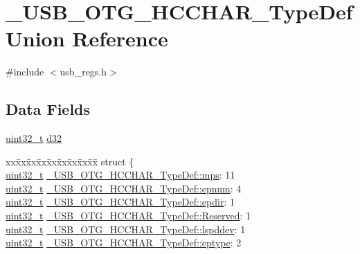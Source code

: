 \hypertarget{union___u_s_b___o_t_g___h_c_c_h_a_r___type_def}{\section{\-\_\-\-U\-S\-B\-\_\-\-O\-T\-G\-\_\-\-H\-C\-C\-H\-A\-R\-\_\-\-Type\-Def Union Reference}
\label{union___u_s_b___o_t_g___h_c_c_h_a_r___type_def}
}


{\ttfamily \#include $<$usb\-\_\-regs.\-h$>$}

\subsection*{Data Fields}
\begin{DoxyCompactItemize}
\item 
\hyperlink{stdint_8h_a435d1572bf3f880d55459d9805097f62}{uint32\-\_\-t} \hyperlink{group___u_s_b___o_t_g___d_r_i_v_e_r_ga0a0a2fc3e4194e8dd800311c652a6391}{d32}
\item 
\begin{tabbing}
xx\=xx\=xx\=xx\=xx\=xx\=xx\=xx\=xx\=\kill
struct \{\\
\>\hyperlink{stdint_8h_a435d1572bf3f880d55459d9805097f62}{uint32\_t} \hyperlink{group___u_s_b___o_t_g___d_r_i_v_e_r_ga5b4ec8eb01d4007623b8fc18806013d3}{\_USB\_OTG\_HCCHAR\_TypeDef::mps}: 11\\
\>\hyperlink{stdint_8h_a435d1572bf3f880d55459d9805097f62}{uint32\_t} \hyperlink{group___u_s_b___o_t_g___d_r_i_v_e_r_ga7e2db9d035440c79fe20394c7f2f6fb2}{\_USB\_OTG\_HCCHAR\_TypeDef::epnum}: 4\\
\>\hyperlink{stdint_8h_a435d1572bf3f880d55459d9805097f62}{uint32\_t} \hyperlink{group___u_s_b___o_t_g___d_r_i_v_e_r_ga69aafd73ac0b1c4a83b7991da998294a}{\_USB\_OTG\_HCCHAR\_TypeDef::epdir}: 1\\
\>\hyperlink{stdint_8h_a435d1572bf3f880d55459d9805097f62}{uint32\_t} \hyperlink{group___u_s_b___o_t_g___d_r_i_v_e_r_ga9195441c8e492c17349fe9493e41a76a}{\_USB\_OTG\_HCCHAR\_TypeDef::Reserved}: 1\\
\>\hyperlink{stdint_8h_a435d1572bf3f880d55459d9805097f62}{uint32\_t} \hyperlink{group___u_s_b___o_t_g___d_r_i_v_e_r_ga4ee44e963bbcf08680aa896b5f39d7d7}{\_USB\_OTG\_HCCHAR\_TypeDef::lspddev}: 1\\
\>\hyperlink{stdint_8h_a435d1572bf3f880d55459d9805097f62}{uint32\_t} \hyperlink{group___u_s_b___o_t_g___d_r_i_v_e_r_gabe6638f1fbc9a10f9f2281165abdf5f9}{\_USB\_OTG\_HCCHAR\_TypeDef::eptype}: 2\\

\end{tabbing}
\end{DoxyCompactItemize}
